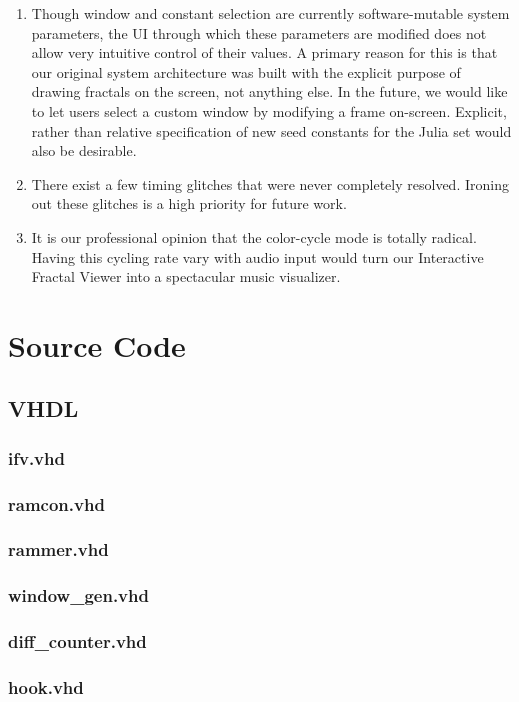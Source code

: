 \documentclass{article}
\begin{document}
\begin{enumerate}
\item Though window and constant selection are currently software-mutable system parameters, the UI through
which these parameters are modified does not allow very intuitive control of their values. A primary reason
for this is that our original system architecture was built with the explicit purpose of drawing fractals on the
screen, not anything else. In the future, we would like to let users select a custom window by modifying a frame 
on-screen. Explicit, rather than relative specification of new seed constants for the Julia set would also be 
desirable.
\item There exist a few timing glitches that were never completely resolved. Ironing out these glitches is a high
priority for future work.
\item It is our professional opinion that the color-cycle mode is totally radical. Having this cycling rate vary 
with audio input would turn our Interactive Fractal Viewer into a spectacular music visualizer.
\end{enumerate}

\appendix
\section{Source Code}
\subsection{VHDL}
\subsubsection{ifv.vhd}							%
\subsubsection{ramcon.vhd}							%
\subsubsection{rammer.vhd}							%
\subsubsection{window\_gen.vhd}					%
\subsubsection{diff\_counter.vhd}					%
\subsubsection{hook.vhd}							%
\end{document}
